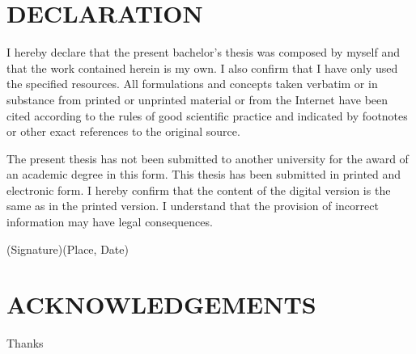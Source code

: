 \documentclass[12pt,twoside]{report}
\numberwithin{equation}{subsection}
\begin{document}
\chapter*{DECLARATION}


I hereby declare that the present bachelor's thesis was composed
by myself and that the work contained herein is my own. I also confirm that I have only used the
specified resources. All formulations and concepts taken verbatim or in substance from printed
or unprinted material or from the Internet have been cited according to the rules of good
scientific practice and indicated by footnotes or other exact references to the original source.

\vline

\noindent The present thesis has not been submitted to another university for the award of an academic
degree in this form. This thesis has been submitted in printed and electronic form. I hereby
confirm that the content of the digital version is the same as in the printed version.
I understand that the provision of incorrect information may have legal consequences.
\vfill

(Signature)\hfill (Place, Date)
\vspace{8.5cm}


\chapter*{ACKNOWLEDGEMENTS}
Thanks 

\tableofcontents
\listoffigures 
\listoftables














\printbibliography
\end{document}
